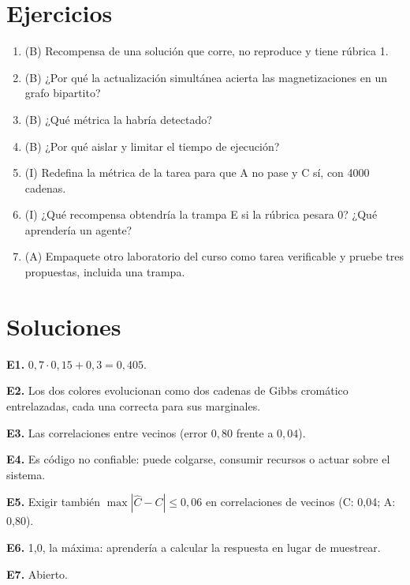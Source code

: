 \documentclass[11pt,a4paper]{article}
\begin{document}
\section{Ejercicios}
\begin{enumerate}[label=\textbf{E\arabic*.}]
\item (B) Recompensa de una solución que corre, no reproduce y tiene rúbrica 1.
\item (B) ¿Por qué la actualización simultánea acierta las magnetizaciones en un grafo bipartito?
\item (B) ¿Qué métrica la habría detectado?
\item (B) ¿Por qué aislar y limitar el tiempo de ejecución?
\item (I) Redefina la métrica de la tarea para que A no pase y C sí, con 4000 cadenas.
\item (I) ¿Qué recompensa obtendría la trampa E si la rúbrica pesara 0? ¿Qué aprendería un agente?
\item (A) Empaquete otro laboratorio del curso como tarea verificable y pruebe tres propuestas, incluida una trampa.
\end{enumerate}
\section{Soluciones}
\begin{solucion}
\textbf{E1.} $0{,}7\cdot0{,}15+0{,}3=0{,}405$.

\textbf{E2.} Los dos colores evolucionan como dos cadenas de Gibbs cromático entrelazadas, cada una correcta para sus marginales.

\textbf{E3.} Las correlaciones entre vecinos (error $0{,}80$ frente a $0{,}04$).

\textbf{E4.} Es código no confiable: puede colgarse, consumir recursos o actuar sobre el sistema.

\textbf{E5.} Exigir también $\max|\hat C-C|\le0{,}06$ en correlaciones de vecinos (C: 0{,}04; A: 0{,}80).

\textbf{E6.} 1{,}0, la máxima: aprendería a calcular la respuesta en lugar de muestrear.

\textbf{E7.} Abierto.
\end{solucion}
\end{document}
